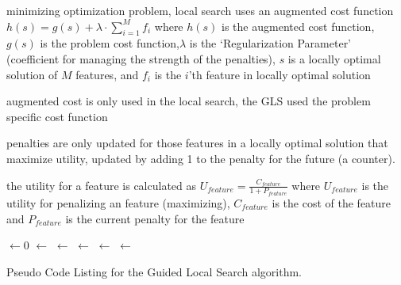 \documentclass[a4paper, 11pt]{article}
\begin{document}
minimizing optimization problem, local search uses an augmented cost function $h(s)=g(s)+\lambda\cdot\sum_{i=1}^{M}f_i$ where 
$h(s)$ is the augmented cost function, $g(s)$ is the problem cost function,$\lambda$ is the `Regularization Parameter' (coefficient for managing the strength of the penalties), $s$ is a locally optimal solution of $M$ features, and $f_i$ is the $i$'th feature in locally optimal solution

augmented cost is only used in the local search, the GLS used the problem specific cost function

penalties are only updated for those features in a locally optimal solution that maximize utility, updated by adding 1 to the penalty for the future (a counter). 

the utility for a feature is calculated as $U_{feature}=\frac{C_{feature}}{1+P_{feature}}$ where $U_{feature}$ is the utility for penalizing an feature (maximizing), $C_{feature}$ is the cost of the feature and $P_{feature}$ is the current penalty for the feature

\begin{algorithm}[htp]
	\SetLine
	\KwIn{\NumIterations, \RegularizationParameter}
	\KwOut{\Best}
	\FeaturePenalties $\leftarrow 0$\;
	\Best $\leftarrow$ \RandomSolution{}\;
	\ForEach{\CurrentIteration $\in$ \NumIterations} {
		\Candidate $\leftarrow$ \LocalSearch{\Best, \RegularizationParameter, \FeaturePenalties}\;	
		\FeatureUtilities $\leftarrow$ \CalculateFeatureUtilities{\Candidate, \FeaturePenalties}\;
		\FeaturePenalties $\leftarrow$ \UpdateFeaturePenalties{\Candidate, \FeaturePenalties, \FeatureUtilities}\;
		\If{\Cost{\Candidate} $\leq$ \Cost{\Best}} {
			\Best $\leftarrow$ \Candidate\;
		}
	}
	\Return{\Best}\;
	\caption{Pseudo Code Listing for the Guided Local Search algorithm.}
	\label{alg:guided_local_search}
\end{algorithm}
\end{document}
